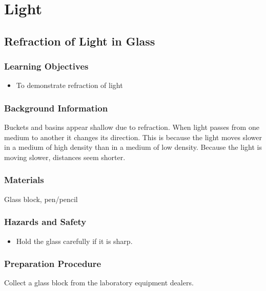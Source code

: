\section{Light}




	
\subsection{Refraction of Light in Glass}

\subsubsection*{Learning Objectives}
\begin{itemize}
\item{To demonstrate refraction of light} 
\end{itemize}

\subsubsection*{Background Information}
Buckets and basins appear shallow due to refraction. When light passes from one medium to another it changes its direction. This is because the light moves slower in a medium of high density than in a medium of low density. Because the light is moving slower, distances seem shorter.  

\subsubsection*{Materials}
Glass block, pen/pencil

\subsubsection*{Hazards and Safety}
\begin{itemize}
\item{Hold the glass carefully if it is sharp.} 
\end{itemize}

\subsubsection*{Preparation Procedure}
Collect a glass block from the laboratory equipment dealers.

